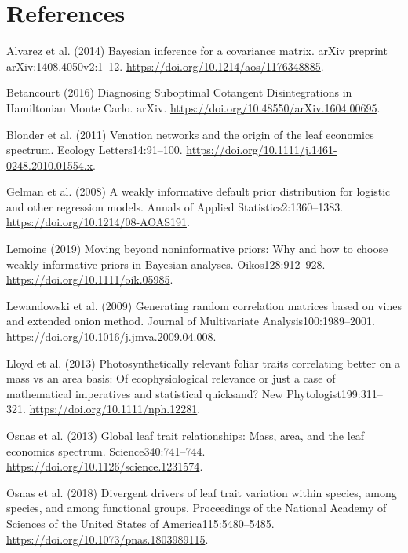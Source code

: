 \documentclass[
  12pt,
  letterpaper,
  DIV=11,
  numbers=noendperiod]{scrartcl}
\newlength{\cslhangindent}
\newenvironment{CSLReferences}[2] %
 {\begin{list}{}{%
  \setlength{\itemindent}{0pt}
  \setlength{\leftmargin}{0pt}
  \setlength{\parsep}{0pt}
  \ifodd #1
   \setlength{\leftmargin}{\cslhangindent}
   \setlength{\itemindent}{-1\cslhangindent}
  \fi
  \setlength{\itemsep}{#2\baselineskip}}}
 {\end{list}}
\numberwithin{equation}{section}
\begin{document}
\newpage

\section*{References}\label{references}

\label{refs}
\begin{CSLReferences}{1}{1}
Alvarez et al. (2014) Bayesian inference for a covariance matrix. arXiv
preprint arXiv:1408.4050v2:1--12.
\url{https://doi.org/10.1214/aos/1176348885}.

Betancourt (2016) Diagnosing {Suboptimal Cotangent Disintegrations} in
{Hamiltonian Monte Carlo}. arXiv.
\url{https://doi.org/10.48550/arXiv.1604.00695}.

Blonder et al. (2011) Venation networks and the origin of the leaf
economics spectrum. Ecology Letters14:91--100.
\url{https://doi.org/10.1111/j.1461-0248.2010.01554.x}.

Gelman et al. (2008) A weakly informative default prior distribution for
logistic and other regression models. Annals of Applied
Statistics2:1360--1383. \url{https://doi.org/10.1214/08-AOAS191}.

Lemoine (2019) Moving beyond noninformative priors: Why and how to
choose weakly informative priors in {Bayesian} analyses.
Oikos128:912--928. \url{https://doi.org/10.1111/oik.05985}.

Lewandowski et al. (2009) Generating random correlation matrices based
on vines and extended onion method. Journal of Multivariate
Analysis100:1989--2001.
\url{https://doi.org/10.1016/j.jmva.2009.04.008}.

Lloyd et al. (2013) Photosynthetically relevant foliar traits
correlating better on a mass vs an area basis: {Of} ecophysiological
relevance or just a case of mathematical imperatives and statistical
quicksand? New Phytologist199:311--321.
\url{https://doi.org/10.1111/nph.12281}.

Osnas et al. (2013) Global leaf trait relationships: {Mass}, area, and
the leaf economics spectrum. Science340:741--744.
\url{https://doi.org/10.1126/science.1231574}.

Osnas et al. (2018) Divergent drivers of leaf trait variation within
species, among species, and among functional groups. Proceedings of the
National Academy of Sciences of the United States of
America115:5480--5485. \url{https://doi.org/10.1073/pnas.1803989115}.


\end{CSLReferences}
\end{document}
